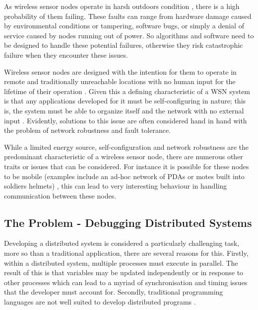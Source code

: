 As wireless sensor nodes operate in harsh outdoors condition \cite{SzewczykPMC04,Werner-Allen:2006:FYV:1298455.1298491}, there is a high probability of them failing. These faults can range from hardware damage caused by environmental conditions or tampering, software bugs, or simply a denial of service caused by nodes running out of power. So algorithms and software need to be designed to handle these potential failures, otherwise they risk catastrophic failure when they encounter these issues.

Wireless sensor nodes are designed with the intention for them to operate in remote and traditionally unreachable locations with no human input for the lifetime of their operation \cite{1437066}. Given this a defining characteristic of a WSN system is that any applications developed for it must be self-configuring in nature; this is, the system must be able to organize itself and the network with no external input \cite{1368897}. Evidently, solutions to this issue are often considered hand in hand with the problem of network robustness and fault tolerance.   

While a limited energy source, self-configuration and network robustness are the predominant characteristic of a wireless sensor node, there are numerous other traits or issues that can be considered. For instance it is possible for these nodes to be mobile (examples include an ad-hoc network of PDAs or motes built into soldiers helmets) \cite{4224091}, this can lead to very interesting behaviour in handling communication between these nodes.


\subsection{The Problem - Debugging Distributed Systems}

Developing a distributed system is considered a particularly challenging task, more so than a traditional application, there are several reasons for this. Firstly, within a distributed system, multiple processes must execute in parallel. The result of this is that variables may be updated independently or in response to other processes which can lead to a myriad of synchronisation and timing issues that the developer must account for. Secondly, traditional programming languages are not well suited to develop distributed programs \cite{93692,345831}.

